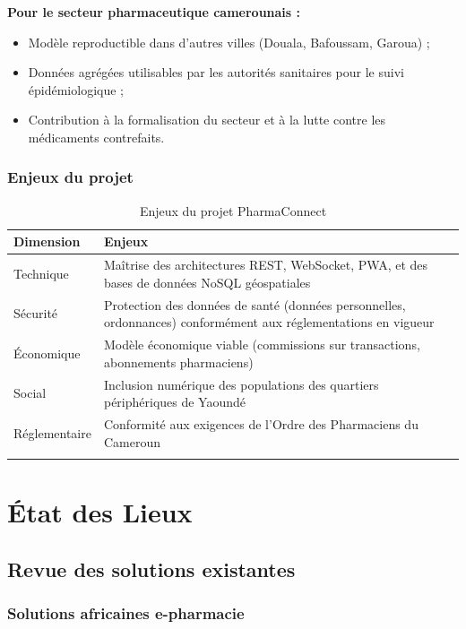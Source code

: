 \documentclass[12pt,a4paper,oneside]{report}
\begin{document}
\textbf{Pour le secteur pharmaceutique camerounais :}
\begin{itemize}
  \item Modèle reproductible dans d'autres villes (Douala, Bafoussam, Garoua) ;
  \item Données agrégées utilisables par les autorités sanitaires pour le suivi épidémiologique ;
  \item Contribution à la formalisation du secteur et à la lutte contre les médicaments contrefaits.
\end{itemize}

\subsection{Enjeux du projet}

\begin{longtable}{L{3cm}L{11cm}}
  \toprule
  \textbf{Dimension} & \textbf{Enjeux} \\
  \midrule
  Technique & Maîtrise des architectures REST, WebSocket, PWA, et des bases de données NoSQL géospatiales \\
  Sécurité & Protection des données de santé (données personnelles, ordonnances) conformément aux réglementations en vigueur \\
  Économique & Modèle économique viable (commissions sur transactions, abonnements pharmaciens) \\
  Social & Inclusion numérique des populations des quartiers périphériques de Yaoundé \\
  Réglementaire & Conformité aux exigences de l'Ordre des Pharmaciens du Cameroun \\
  \bottomrule
  \caption{Enjeux du projet PharmaConnect}
\end{longtable}

\clearpage

\chapter{État des Lieux}

\section{Revue des solutions existantes}

\subsection{Solutions africaines e-pharmacie}
\end{document}
